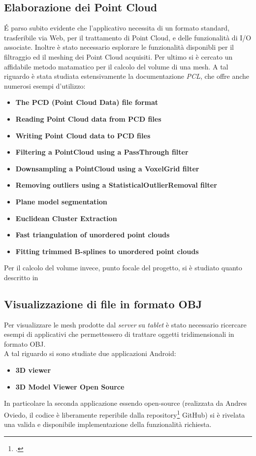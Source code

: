 \subsection{Elaborazione dei Point Cloud}
\'E parso subito evidente che l'applicativo necessita di un formato standard, trasferibile via Web, per il trattamento di Point Cloud, e delle funzionalità di I/O associate. Inoltre è stato necessario esplorare le funzionalità disponibli per il filtraggio ed il meshing dei Point Cloud acquisiti. Per ultimo si è cercato un affidabile metodo matamatico per il calcolo del volume di una mesh. A tal riguardo è stata studiata estensivamente la documentazione \emph{PCL}, che offre anche numerosi esempi d'utilizzo:
\begin{itemize}
\item\textbf{The PCD (Point Cloud Data) file format} \cite{site:PCD}
\item\textbf{Reading Point Cloud data from PCD files} \cite{site:PCD-read}
\item\textbf{Writing Point Cloud data to PCD files} \cite{site:PCD-write}
\item\textbf{Filtering a PointCloud using a PassThrough filter} \cite{site:passthrough}
\item\textbf{Downsampling a PointCloud using a VoxelGrid filter} \cite{site:voxel}
\item\textbf{Removing outliers using a StatisticalOutlierRemoval filter} \cite{site:outliers}
\item\textbf{Plane model segmentation}\cite{site:segmentation}
\item\textbf{Euclidean Cluster Extraction}\cite{site:cluster}
\item \textbf{Fast triangulation of unordered point clouds}\cite{site:meshing}
\item \textbf{Fitting trimmed B-splines to unordered point clouds}\cite{site:bsplines}
\end{itemize}
\noindent
Per il calcolo del volume invece, punto focale del progetto, si è studiato quanto descritto in \cite{paper:volume}

\subsection{Visualizzazione di file in formato OBJ}
Per visualizzare le mesh prodotte dal \emph{server} su \emph{tablet} è stato necessario ricercare esempi di applicativi che permettessero di trattare oggetti tridimensionali in formato OBJ.\\
A tal riguardo si sono studiate due applicazioni Android:
\begin{itemize}
\item\textbf{3D viewer}\cite{site:3d-viewer}
\item\textbf{3D Model Viewer Open Source}\cite{site:3d-viewer-os}
\end{itemize}
\noindent
In particolare la seconda applicazione essendo open-source (realizzata da Andres Oviedo, il codice è liberamente reperibile dalla repository\footcite{https://github.com/andresoviedo/android-3D-model-viewer} GitHub) si è rivelata una valida e disponibile implementazione della funzionalità richiesta.

